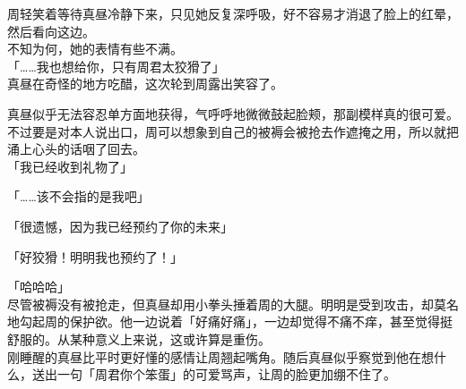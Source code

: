 周轻笑着等待真昼冷静下来，只见她反复深呼吸，好不容易才消退了脸上的红晕，然后看向这边。\\

不知为何，她的表情有些不满。\\

「……我也想给你，只有周君太狡猾了」\\

真昼在奇怪的地方吃醋，这次轮到周露出笑容了。

真昼似乎无法容忍单方面地获得，气呼呼地微微鼓起脸颊，那副模样真的很可爱。不过要是对本人说出口，周可以想象到自己的被褥会被抢去作遮掩之用，所以就把涌上心头的话咽了回去。\\

「我已经收到礼物了」

「……该不会指的是我吧」

「很遗憾，因为我已经预约了你的未来」

「好狡猾！明明我也预约了！」

「哈哈哈」\\

尽管被褥没有被抢走，但真昼却用小拳头捶着周的大腿。明明是受到攻击，却莫名地勾起周的保护欲。他一边说着「好痛好痛」，一边却觉得不痛不痒，甚至觉得挺舒服的。从某种意义上来说，这或许算是重伤。\\

刚睡醒的真昼比平时更好懂的感情让周翘起嘴角。随后真昼似乎察觉到他在想什么，送出一句「周君你个笨蛋」的可爱骂声，让周的脸更加绷不住了。
